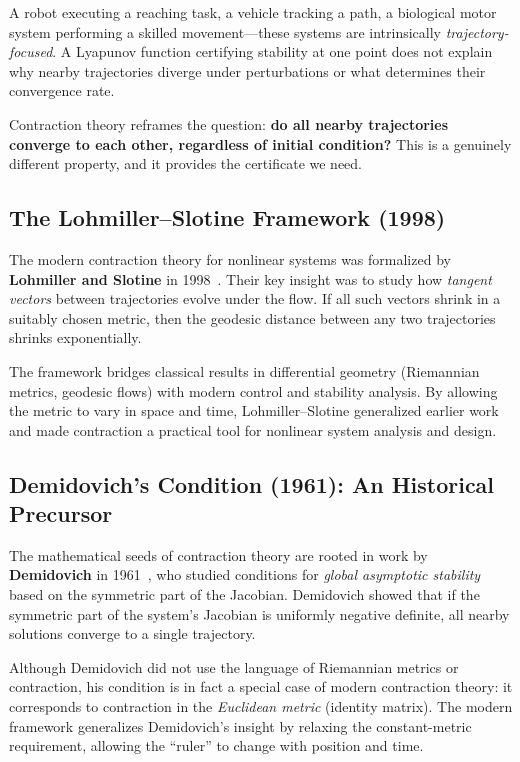 A robot executing a reaching task, a vehicle tracking a path, a biological motor system
performing a skilled movement---these systems are intrinsically \emph{trajectory-focused}.
A Lyapunov function certifying stability at one point does not explain why nearby
trajectories diverge under perturbations or what determines their convergence rate.

Contraction theory reframes the question: \textbf{do all nearby trajectories converge
to each other, regardless of initial condition?} This is a genuinely different property,
and it provides the certificate we need.

\subsection{The Lohmiller--Slotine Framework (1998)}

The modern contraction theory for nonlinear systems was formalized by \textbf{Lohmiller and
Slotine} in 1998~\cite{Lohmiller1998}. Their key insight was to study how \emph{tangent
vectors} between trajectories evolve under the flow. If all such vectors shrink in a
suitably chosen metric, then the geodesic distance between any two trajectories shrinks
exponentially.

The framework bridges classical results in differential geometry (Riemannian metrics,
geodesic flows) with modern control and stability analysis. By allowing the metric to
vary in space and time, Lohmiller--Slotine generalized earlier work and made contraction
a practical tool for nonlinear system analysis and design.

\subsection{Demidovich's Condition (1961): An Historical Precursor}

The mathematical seeds of contraction theory are rooted in work by \textbf{Demidovich}
in 1961~\cite{Demidovich1961}, who studied conditions for \emph{global asymptotic stability}
based on the symmetric part of the Jacobian. Demidovich showed that if the symmetric part
of the system's Jacobian is uniformly negative definite, all nearby solutions converge
to a single trajectory.

Although Demidovich did not use the language of Riemannian metrics or contraction, his
condition is in fact a special case of modern contraction theory: it corresponds to
contraction in the \emph{Euclidean metric} (identity matrix). The modern framework
generalizes Demidovich's insight by relaxing the constant-metric requirement, allowing
the ``ruler'' to change with position and time.

